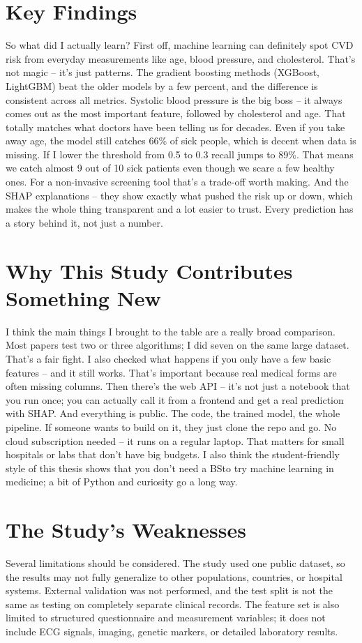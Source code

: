 \documentclass[12pt, a4paper, oneside]{book}
\begin{document}
\section{Key Findings}
So what did I actually learn? First off, machine learning can definitely spot CVD risk from everyday measurements like age, blood pressure, and cholesterol. That's not magic -- it's just patterns. The gradient boosting methods (XGBoost, LightGBM) beat the older models by a few percent, and the difference is consistent across all metrics. Systolic blood pressure is the big boss -- it always comes out as the most important feature, followed by cholesterol and age. That totally matches what doctors have been telling us for decades. Even if you take away age, the model still catches 66\% of sick people, which is decent when data is missing. If I lower the threshold from 0.5 to 0.3 recall jumps to 89\%. That means we catch almost 9 out of 10 sick patients even though we scare a few healthy ones. For a non-invasive screening tool that's a trade-off worth making. And the SHAP explanations -- they show exactly what pushed the risk up or down, which makes the whole thing transparent and a lot easier to trust. Every prediction has a story behind it, not just a number.

\section{Why This Study Contributes Something New}
I think the main things I brought to the table are a really broad comparison. Most papers test two or three algorithms; I did seven on the same large dataset. That's a fair fight. I also checked what happens if you only have a few basic features -- and it still works. That's important because real medical forms are often missing columns. Then there's the web API -- it's not just a notebook that you run once; you can actually call it from a frontend and get a real prediction with SHAP. And everything is public. The code, the trained model, the whole pipeline. If someone wants to build on it, they just clone the repo and go. No cloud subscription needed -- it runs on a regular laptop. That matters for small hospitals or labs that don't have big budgets. I also think the student-friendly style of this thesis shows that you don't need a BSto try machine learning in medicine; a bit of Python and curiosity go a long way.

\section{The Study's Weaknesses}
Several limitations should be considered. The study used one public dataset, so the results may not fully generalize to other populations, countries, or hospital systems. External validation was not performed, and the test split is not the same as testing on completely separate clinical records. The feature set is also limited to structured questionnaire and measurement variables; it does not include ECG signals, imaging, genetic markers, or detailed laboratory results.
\end{document}
